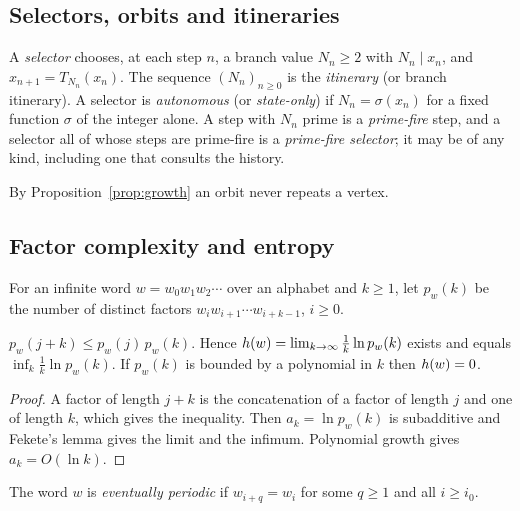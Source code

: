 \subsection{Selectors, orbits and itineraries}
\begin{definition}\label{def:selector}
A \emph{selector} chooses, at each step $n$, a branch value $N_n\ge2$ with $N_n\mid x_n$, and $x_{n+1}=T_{N_n}(x_n)$. The sequence $(N_n)_{n\ge0}$ is the \emph{itinerary} (or branch itinerary). A selector is \emph{autonomous} (or \emph{state-only}) if $N_n=\sigma(x_n)$ for a fixed function $\sigma$ of the integer alone. A step with $N_n$ prime is a \emph{prime-fire} step, and a selector all of whose steps are prime-fire is a \emph{prime-fire selector}; it may be of any kind, including one that consults the history.
\end{definition}
By Proposition~\ref{prop:growth} an orbit never repeats a vertex.

\subsection{Factor complexity and entropy}
For an infinite word $w=w_0w_1w_2\cdots$ over an alphabet and $k\ge1$, let $p_w(k)$ be the number of distinct factors $w_iw_{i+1}\cdots w_{i+k-1}$, $i\ge0$.
\begin{lemma}[Entropy]\label{lem:entropy}
$p_w(j+k)\le p_w(j)\,p_w(k)$. Hence $h(w)=\lim_{k\to\infty}\tfrac1k\ln p_w(k)$ exists and equals $\inf_k\tfrac1k\ln p_w(k)$. If $p_w(k)$ is bounded by a polynomial in $k$ then $h(w)=0$.
\end{lemma}
\begin{proof} A factor of length $j+k$ is the concatenation of a factor of length $j$ and one of length $k$, which gives the inequality. Then $a_k=\ln p_w(k)$ is subadditive and Fekete's lemma gives the limit and the infimum. Polynomial growth gives $a_k=O(\ln k)$. \end{proof}
The word $w$ is \emph{eventually periodic} if $w_{i+q}=w_i$ for some $q\ge1$ and all $i\ge i_0$.
